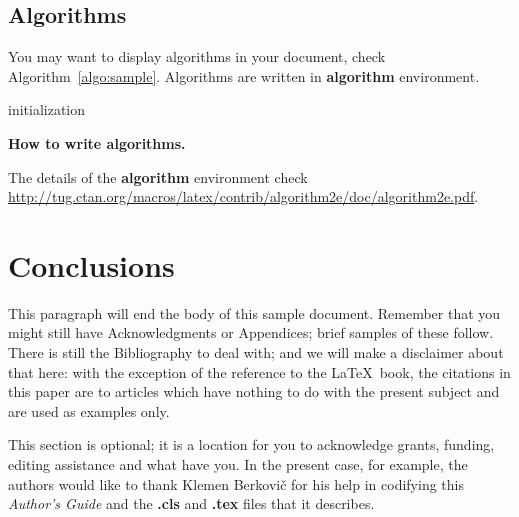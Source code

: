 \documentclass[article]{stucosrec}
\begin{document}
	\subsection{Algorithms}
	
	You may want to display algorithms in your document, check Algorithm~\ref{algo:sample}.
	Algorithms are written in \textbf{algorithm} environment.
	
	\begin{algorithm}
		\SetAlgoLined
		initialization\;
		\caption{\bf How to write algorithms.}
		\label{algo:sample}
	\end{algorithm}

	The details of the \textbf{algorithm} environment check \url{http://tug.ctan.org/macros/latex/contrib/algorithm2e/doc/algorithm2e.pdf}.
	
	\section{Conclusions}
	
	This paragraph will end the body of this sample document.
	Remember that you might still have Acknowledgments or Appendices; brief samples of these follow.
	There is still the Bibliography to deal with; and we will make a disclaimer about that here: with the exception of the reference to the \LaTeX\ book, the citations in this paper are to articles which have nothing to do with the present subject and are used as examples only.
	
	\begin{acknowledgment}
		This section is optional; it is a location for you to acknowledge grants, funding, editing assistance and what have you.
		In the present case, for example, the authors would like to thank Klemen Berkovič for his help in codifying this \textit{Author's Guide} and the \textbf{.cls} and \textbf{.tex} files that it describes.
	\end{acknowledgment}

	
	
\end{document}
